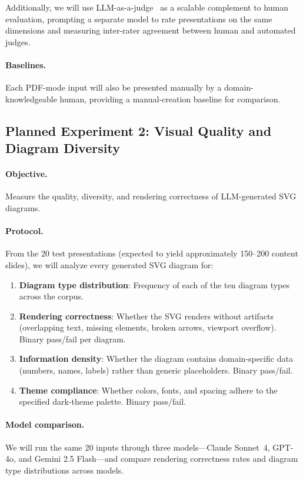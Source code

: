 \documentclass[11pt,a4paper]{article}
\begin{document}
Additionally, we will use LLM-as-a-judge~\citep{zheng2024judging} as a scalable complement to human evaluation, prompting a separate model to rate presentations on the same dimensions and measuring inter-rater agreement between human and automated judges.

\paragraph{Baselines.}
Each PDF-mode input will also be presented manually by a domain-knowledgeable human, providing a manual-creation baseline for comparison.

\subsection{Planned Experiment 2: Visual Quality and Diagram Diversity}
\label{sec:eval-visual}

\paragraph{Objective.}
Measure the quality, diversity, and rendering correctness of LLM-generated SVG diagrams.

\paragraph{Protocol.}
From the 20 test presentations (expected to yield approximately 150--200 content slides), we will analyze every generated SVG diagram for:

\begin{enumerate}[leftmargin=*,nosep]
    \item \textbf{Diagram type distribution}: Frequency of each of the ten diagram types across the corpus.
    \item \textbf{Rendering correctness}: Whether the SVG renders without artifacts (overlapping text, missing elements, broken arrows, viewport overflow). Binary pass/fail per diagram.
    \item \textbf{Information density}: Whether the diagram contains domain-specific data (numbers, names, labels) rather than generic placeholders. Binary pass/fail.
    \item \textbf{Theme compliance}: Whether colors, fonts, and spacing adhere to the specified dark-theme palette. Binary pass/fail.
\end{enumerate}

\paragraph{Model comparison.}
We will run the same 20 inputs through three models---Claude Sonnet~4, GPT-4o, and Gemini 2.5 Flash---and compare rendering correctness rates and diagram type distributions across models.
\end{document}
